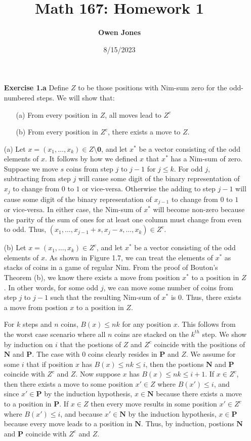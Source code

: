 \documentclass[10pt]{article}
\title{\bf Math 167: Homework 1}
\date{8/15/2023}
\author{\bf Owen Jones}
\begin{document}
\maketitle

\begin{itemize}
    \item [\textbf{Exercise 1.a}] Define $Z$ to be those positions with Nim-sum zero for the odd-numbered steps. We will show that:
    \begin{itemize}
        \item [(a)] From every position in $Z$, all moves lead to $Z^c$
        \item [(b)] From every position in $Z^c$, there exists a move to $Z$.
    \end{itemize}\par 
(a) Let $x=(x_1,\dots,x_k)\in Z\setminus\mathbf{0}$, and let $x^*$ be a vector consisting of the odd elements of $x$. It follows by how we defined $x$ that $x^*$ has a Nim-sum of zero. 
Suppose we move $s$ coins from step $j$ to $j-1$ for $j\le k$. 
For odd $j$, subtracting from step $j$ will cause some digit of the binary representation of $x_j$ to change from $0$ to $1$ or vice-versa. Otherwise the adding to step $j-1$ will cause some digit of the binary representation of $x_{j-1}$ to change from $0$ to $1$ or vice-versa. 
In either case, the Nim-sum of $x^*$ will become non-zero because the parity of the sum of ones for at least one column must change from even to odd.
Thus, $(x_1,\dots,x_{j-1}+s,x_j-s,\dots,x_k)\in Z^c$.\par
(b) Let $x=(x_1,\dots,x_k)\in Z^c$, and let $x^*$ be a vector consisting of the odd elements of $x$. As shown in Figure 1.7, we can treat the elements of $x^*$ as stacks of coins in a game of regular Nim. From the proof of Bouton's Theorem (b), we know there exists a move from position $x^*$ to a position in $Z$. In other words, for some odd $j$, we can move some number of coins from step $j$ to $j-1$ such that the resulting Nim-sum of $x^*$ is $0$. Thus, there exists a move from postion $x$ to a position in $Z$.\par
For $k$ steps and $n$ coins, $B(x)\le nk$ for any position $x$. This follows from the worst case scenario where all $n$ coins are stacked on the $k^{th}$ step. We show by induction on $i$ that the postions of $Z$ and $Z^c$ coincide with the positions of $\mathbf{N}$ and $\mathbf{P}$. 
The case with $0$ coins clearly resides in $\mathbf{P}$ and $Z$. We assume for some $i$ that if position $x$ has $B(x)\le nk\le i$, then the postions $\mathbf{N}$ and $\mathbf{P}$ coincide with $Z^c$ and $Z$. 
Now suppose $x$ has $B(x)\le nk\le i+1$. If $x\in Z^c$, then there exists a move to some position $x'\in Z$ where $B(x')\le i$, and since $x'\in \mathbf{P}$ by the induction hypothesis, $x\in \mathbf{N}$ because there exists a move to a position in $\mathbf{P}$. If $x\in Z$ then every move results in some position $x'\in Z^c$ where $B(x')\le i$, and because $x'\in \mathbf{N}$ by the induction hypothesis, $x\in \mathbf{P}$ because every move leads to a position in $\mathbf{N}$. Thus, by induction, postions $\mathbf{N}$ and $\mathbf{P}$ coincide with $Z^c$ and $Z$. 


\end{itemize}
\end{document}
